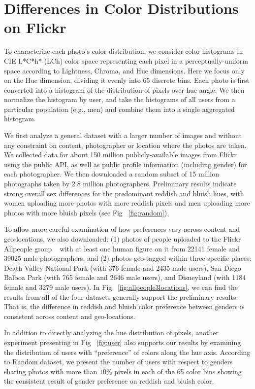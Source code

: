 \section{Differences in Color Distributions on Flickr}
To characterize each photo's color distribution, we consider color histograms in CIE L*C*h* (LCh) color space representing each pixel in a perceptually-uniform space according to Lightness, Chroma, and Hue dimensions.
Here we focus only on the Hue dimension, dividing it evenly into 65 discrete bins.
Each photo is first converted into a histogram of the distribution of pixels over hue angle. We then normalize the histogram by user, and take the histograms of all users from a particular population (e.g., men) and combine them into a single aggregated histogram.

We first analyze a general dataset with a larger number of images and without any constraint on content, photographer or location where the photos are taken.
We collected data for about 150 million publicly-available images from Flickr using the public API, as well as public profile information (including gender) for each photographer. We then downloaded a random subset of 15 million photographs taken by 2.8 million photographers.
Preliminary results indicate strong overall sex differences for the predominant reddish and bluish hues, with women uploading more photos with more reddish pixels and men uploading more photos with more bluish pixels (see Fig ~\ref{fig:random}).  

To allow more careful examination of how preferences vary across content and geo-locations, we also downloaded: (1) photos of people uploaded to the Flickr Allpeople group ~\cite{allpeople} 
with at least one human figure on it from 22141 female and 39025 male photographers, and (2) photos geo-tagged within three specific places: Death Valley National Park (with 376 female and 2435 male users), San Diego Balboa Park (with 765 female and 2646 male users), and Disneyland (with 1184 female and 3279 male users).
In Fig ~\ref{fig:allpeople3locations}, we can find the results from all of the four datasets generally support the preliminary results. 
That is, the difference in reddish and bluish color preference between genders is consistent across content and geo-locations.

In addition to directly analyzing the hue distribution of pixels, another experiment presenting in Fig ~\ref{fig:user} also supports our results by examining the distribution of users with ``preference'' of colors along the hue axis.
According to Random dataset, we present the number of users with respect to genders sharing photos with more than $10\%$ pixels in each of the 65 color bins showing the consistent result of gender preference on reddish and bluish color.

